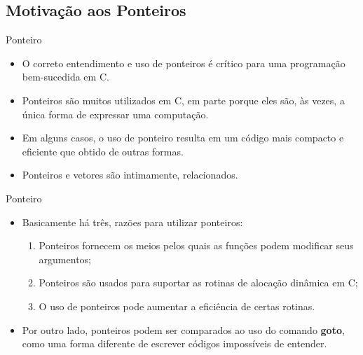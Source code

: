 \subsection{Motivação aos Ponteiros}

\begin{frame}[c]{Ponteiro}

  \begin{itemize}[<+->]
   \item O correto entendimento e uso de ponteiros é crítico para uma programação bem-sucedida em C.
  \item Ponteiros são muitos utilizados em C, em parte porque eles são, às vezes, a única forma de expressar uma computação.
  \item Em alguns casos, o uso de ponteiro resulta em um código mais compacto e eficiente que obtido de outras formas.
  \item Ponteiros e vetores são intimamente, relacionados.  
  \end{itemize}
  
\end{frame}

\begin{frame}[c]{Ponteiro}
 \begin{itemize}[<+->]
   \item Basicamente há três, razões para utilizar ponteiros:
      \begin{enumerate}[<+->]
        \item Ponteiros fornecem os meios pelos quais as funções podem modificar seus argumentos;
        \item Ponteiros são usados para suportar as rotinas de alocação dinâmica em C;
        \item O uso de ponteiros pode aumentar a eficiência de certas rotinas.
    \end{enumerate}
  \item Por outro lado, ponteiros podem ser comparados ao uso do comando \textbf{goto}, como uma forma diferente de escrever códigos impossíveis de entender. 
 \end{itemize}
\end{frame}

